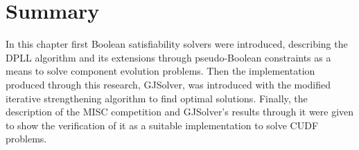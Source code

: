 

\section{Summary}
In this chapter first Boolean satisfiability solvers were introduced, 
describing the DPLL algorithm and its extensions through pseudo-Boolean constraints as a means to solve component evolution problems.
Then the implementation produced through this research, GJSolver, was introduced with the modified iterative strengthening algorithm to find optimal solutions.
Finally, the description of the MISC competition and GJSolver's results through it were given to show the verification of it as a suitable implementation to solve CUDF problems.
